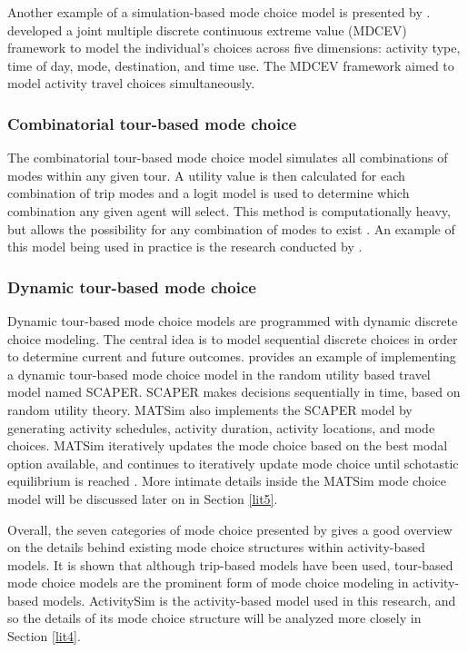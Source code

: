 \documentclass[3p, authoryear, review]{elsarticle} %
\begin{document}
Another example of a simulation-based mode choice model is presented by \citet{eluru10}. \citet{eluru10} developed a joint multiple discrete continuous extreme value (MDCEV) framework to model the individual's choices across five dimensions: activity type, time of day, mode, destination, and time use. The MDCEV framework aimed to model activity travel choices simultaneously.

\hypertarget{lit36}{%
\subsubsection{Combinatorial tour-based mode choice}\label{lit36}}

The combinatorial tour-based mode choice model simulates all combinations of modes within any given tour. A utility value is then calculated for each combination of trip modes and a logit model is used to determine which combination any given agent will select. This method is computationally heavy, but allows the possibility for any combination of modes to exist \citep{hasnine21}. An example of this model being used in practice is the research conducted by \citet{vovsha17}.

\hypertarget{lit37}{%
\subsubsection{Dynamic tour-based mode choice}\label{lit37}}

Dynamic tour-based mode choice models are programmed with dynamic discrete choice modeling. The central idea is to model sequential discrete choices in order to determine current and future outcomes. \citet{saleem18} provides an example of implementing a dynamic tour-based mode choice model in the random utility based travel model named SCAPER. SCAPER makes decisions sequentially in time, based on random utility theory. MATSim also implements the SCAPER model by generating activity schedules, activity duration, activity locations, and mode choices. MATSim iteratively updates the mode choice based on the best modal option available, and continues to iteratively update mode choice until schotastic equilibrium is reached \citep{hasnine21}. More intimate details inside the MATSim mode choice model will be discussed later on in Section \ref{lit5}.

Overall, the seven categories of mode choice presented by \citet{hasnine21} gives a good overview on the details behind existing mode choice structures within activity-based models. It is shown that although trip-based models have been used, tour-based mode choice models are the prominent form of mode choice modeling in activity-based models. ActivitySim is the activity-based model used in this research, and so the details of its mode choice structure will be analyzed more closely in Section \ref{lit4}.
\end{document}

